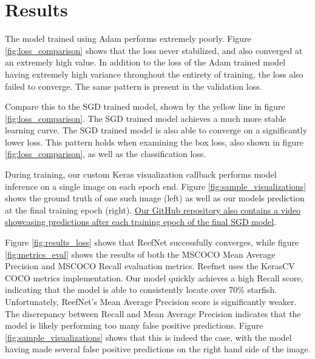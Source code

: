 \documentclass{article}
\begin{document}
\section{Results}
The model trained using Adam performs extremely poorly.  Figure \ref{fig:loss_comparison} shows that the loss never stabilized, and also converged at an extremely high value.  In addition to the loss of the Adam trained model having extremely high variance throughout the entirety of training, the loss also failed to converge.  The same pattern is present in the validation loss.

Compare this to the SGD trained model, shown by the yellow line in figure \ref{fig:loss_comparison}.  The SGD trained model achieves a much more stable learning curve.  The SGD trained model is also able to converge on a significantly lower loss.  This pattern holds when examining the box loss, also shown in figure \ref{fig:loss_comparison}, as well as the classification loss.

During training, our custom Keras visualization callback performs model inference on a single image on each epoch end. 
Figure \ref{fig:sample_visualizations} shows the ground truth of one such image (left) as well as our models prediction at the final training epoch (right).
\href{https://github.com/lukewood/reef-net}{Our GitHub repository also contains a video showcasing predictions after each training epoch of the final SGD model}.

Figure \ref{fig:results_loss} shows that ReefNet successfully converges, while 
figure \ref{fig:metrics_eval} shows the results of both the MSCOCO Mean Average Precision and MSCOCO Recall evaluation metrics\cite{coco}.
Reefnet uses the KerasCV COCO metrics implementation\cite{wood2022kerascv}.
Our model quickly achieves a high Recall score, indicating that the model is able to consistently locate over 70\% starfish.
Unfortunately, ReefNet's Mean Average Precision score is significantly weaker.
The discrepancy between Recall and Mean Average Precision indicates that the model is likely performing too many false positive predictions.
Figure \ref{fig:sample_visualizations} shows that this is indeed the case, with the model having made several false positive predictions on the right hand side of the image.
\end{document}
